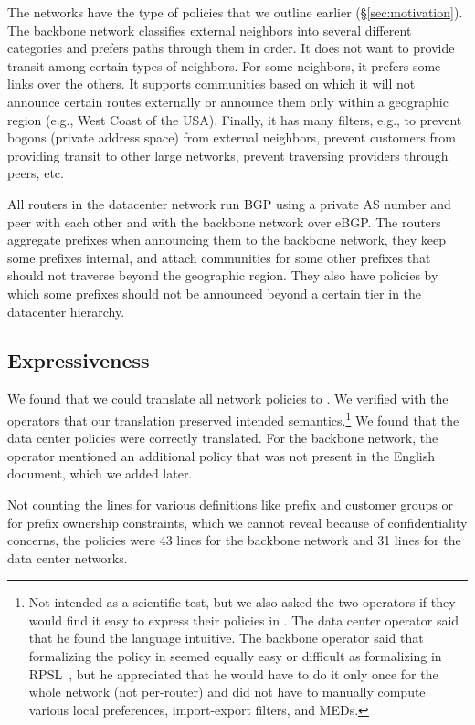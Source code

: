 The networks have the type of policies that we outline earlier (\S\ref{sec:motivation}). The backbone network classifies external neighbors into several different categories and prefers paths through them in order. It does not want to provide transit among certain types of neighbors. For some neighbors, it prefers some links over the others. It supports communities based on which it will not announce certain routes externally or announce them only within a geographic region (e.g., West Coast of the USA). Finally, it has many filters, e.g., to prevent bogons (private address space) from external neighbors, prevent customers from providing transit to other large networks, prevent traversing providers through peers, etc.

All routers in the datacenter network run BGP using a private AS number and peer with each other and with the backbone network over eBGP. The routers aggregate prefixes when announcing them to the backbone network, they keep some prefixes internal, and attach communities for some other prefixes that should not traverse beyond the geographic region. They also have policies by which some prefixes should not be announced beyond a certain tier in the datacenter hierarchy.

\subsection{Expressiveness}

We found that we could translate all network policies to \sysname. We verified with the operators that our translation preserved intended semantics.\footnote{Not intended as a scientific test, but we also asked the two operators if they would find it easy to express their policies in \sysname. The data center operator said that he found the language intuitive. The backbone operator said that formalizing the policy in \sysname seemed equally easy or difficult as formalizing in RPSL~\cite{x}, but he appreciated that he would have to do it only once for the whole network (not per-router) and did not have to manually compute various local preferences, import-export filters, and MEDs.} We found that the data center policies were correctly translated. For the backbone network, the operator mentioned an additional policy that was not present in the English document, which we added later.

Not counting the lines for various definitions like prefix and customer groups or for prefix ownership constraints, which we cannot reveal because of confidentiality concerns, the \sysname policies were 43 lines for the backbone network and 31 lines for the data center networks.

